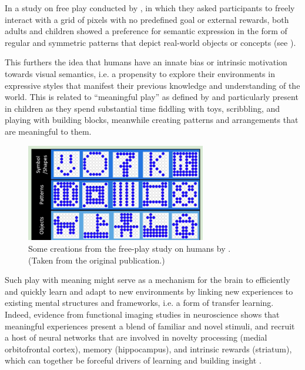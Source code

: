 In a study on free play conducted by \citet{diggs}, in which they asked participants to freely interact with a grid of pixels with no predefined goal or external rewards, both adults and children showed a preference for semantic expression in the form of regular and symmetric patterns that depict real-world objects or concepts (see ).

This furthers the idea that humans have an innate bias or intrinsic motivation towards visual semantics, i.e. a propensity to explore their environments in expressive styles that manifest their previous knowledge and understanding of the world.
This is related to ``meaningful play'' as defined by \citet{unesco} and particularly present in children as they spend substantial time fiddling with toys, scribbling, and playing with building blocks, meanwhile creating patterns and arrangements that are meaningful to them.

\begin{figure}[h]
    \centering
    \includegraphics[width=0.7\textwidth]{images/diggs.png}
    \captionsetup{justification=centering}
    \caption[Some creations from the free-play study on humans by \cite{diggs}.]{Some creations from the free-play study on humans by \cite{diggs}.\\(Taken from the original publication.)}
    \label{fig:diggs}
\end{figure}

Such play with meaning might serve as a mechanism for the brain to efficiently and quickly learn and adapt to new environments by linking new experiences to existing mental structures and frameworks, i.e. a form of transfer learning.
Indeed, evidence from functional imaging studies in neuroscience shows that meaningful experiences present a blend of familiar and novel stimuli, and recruit a host of neural networks that are involved in novelty processing (medial orbitofrontal cortex), memory (hippocampus), and intrinsic rewards (striatum), which can together be forceful drivers of learning \citep{neuronovel} and building insight \citep{insight}.

